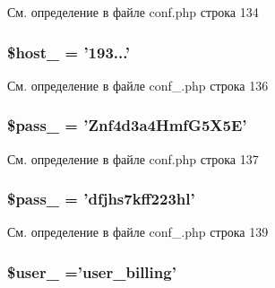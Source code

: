 См. определение в файле conf.\-php строка 134

\hypertarget{group___d_b__3_ga9782328ab4366de7daff22fe23704413}{
\subsubsection[{\$host\-\_\-3}]{\setlength{\rightskip}{0pt plus 5cm}\$host\-\_ = '193...'}}\label{group___d_b__3_ga9782328ab4366de7daff22fe23704413}


См. определение в файле conf\-\_\-.\-php строка 136

\hypertarget{group___d_b__3_gaaa7650887f2a6a859cb6420d9dba37f0}{
\subsubsection[{\$pass\-\_\-3}]{\setlength{\rightskip}{0pt plus 5cm}\$pass\-\_ = 'Znf4d3a4\-Hmf\-G5\-X5\-E'}}\label{group___d_b__3_gaaa7650887f2a6a859cb6420d9dba37f0}


См. определение в файле conf.\-php строка 137

\hypertarget{group___d_b__3_gaaa7650887f2a6a859cb6420d9dba37f0}{
\subsubsection[{\$pass\-\_\-3}]{\setlength{\rightskip}{0pt plus 5cm}\$pass\-\_ = 'dfjhs7kff223hl'}}\label{group___d_b__3_gaaa7650887f2a6a859cb6420d9dba37f0}


См. определение в файле conf\-\_\-.\-php строка 139

\hypertarget{group___d_b__3_ga5f8fd50656344478702668d5de68e802}{
\subsubsection[{\$user\-\_\-3}]{\setlength{\rightskip}{0pt plus 5cm}\$user\-\_ ='user\-\_\-billing'}}\label{group___d_b__3_ga5f8fd50656344478702668d5de68e802}


